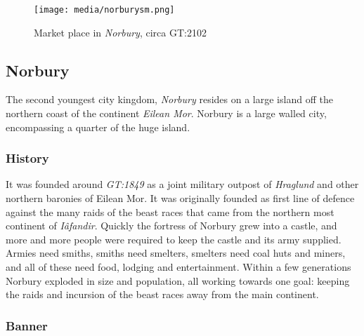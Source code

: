 \begin{figure}[ht!]
  \centering
  \vspace{-2.6cm}
  \centerline{
    \texttt{[image: media/norburysm.png]}
  }
  \par
  Market place in \emph{Norbury}, circa GT:2102
\end{figure}

\subsection{Norbury}
\label{sec:Norbury}


The second youngest city kingdom, \emph{Norbury} resides on a large island off
the northern coast of the continent \emph{Eilean Mor}. Norbury is a large
walled city, encompassing a quarter of the huge island.

\subsubsection{History}

It was founded around \emph{GT:1849} as a joint military outpost of
\emph{Hraglund} and other northern baronies of Eilean Mor. It was originally
founded as first line of defence against the many raids of the beast races
that came from the northern most continent of \emph{Iâfandir}. Quickly the
fortress of Norbury grew into a castle, and more and more people were
required to keep the castle and its army supplied. Armies need smiths,
smiths need smelters, smelters need coal huts and miners, and all of
these need food, lodging and entertainment. Within a few generations
Norbury exploded in size and population, all working towards one goal:
keeping the raids and incursion of the beast races away from the main
continent.

\subsubsection{Banner}


